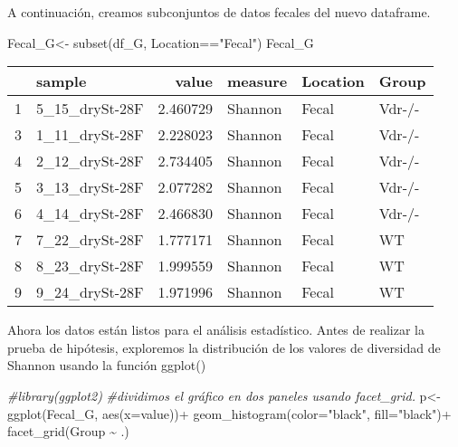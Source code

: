 \documentclass[
]{article}
\newenvironment{Shaded}{\begin{snugshade}}{\end{snugshade}}
\newcommand{\AttributeTok}[1]{\textcolor[rgb]{0.77,0.63,0.00}{#1}}
\newcommand{\CommentTok}[1]{\textcolor[rgb]{0.56,0.35,0.01}{\textit{#1}}}
\newcommand{\FunctionTok}[1]{\textcolor[rgb]{0.00,0.00,0.00}{#1}}
\newcommand{\NormalTok}[1]{#1}
\newcommand{\OtherTok}[1]{\textcolor[rgb]{0.56,0.35,0.01}{#1}}
\newcommand{\SpecialCharTok}[1]{\textcolor[rgb]{0.00,0.00,0.00}{#1}}
\newcommand{\StringTok}[1]{\textcolor[rgb]{0.31,0.60,0.02}{#1}}
\begin{document}
A continuación, creamos subconjuntos de datos fecales del nuevo
dataframe.

\begin{Shaded}
\begin{Highlighting}[]
\NormalTok{Fecal\_G}\OtherTok{\textless{}{-}} \FunctionTok{subset}\NormalTok{(df\_G, Location}\SpecialCharTok{==}\StringTok{"Fecal"}\NormalTok{)}
\NormalTok{Fecal\_G}
\end{Highlighting}
\end{Shaded}

\begin{longtable}[]{@{}llrlll@{}}
\toprule()
& sample & value & measure & Location & Group \\
\midrule()
\endhead
1 & 5\_15\_drySt-28F & 2.460729 & Shannon & Fecal & Vdr-/- \\
3 & 1\_11\_drySt-28F & 2.228023 & Shannon & Fecal & Vdr-/- \\
4 & 2\_12\_drySt-28F & 2.734405 & Shannon & Fecal & Vdr-/- \\
5 & 3\_13\_drySt-28F & 2.077282 & Shannon & Fecal & Vdr-/- \\
6 & 4\_14\_drySt-28F & 2.466830 & Shannon & Fecal & Vdr-/- \\
7 & 7\_22\_drySt-28F & 1.777171 & Shannon & Fecal & WT \\
8 & 8\_23\_drySt-28F & 1.999559 & Shannon & Fecal & WT \\
9 & 9\_24\_drySt-28F & 1.971996 & Shannon & Fecal & WT \\
\bottomrule()
\end{longtable}

Ahora los datos están listos para el análisis estadístico. Antes de
realizar la prueba de hipótesis, exploremos la distribución de los
valores de diversidad de Shannon usando la función ggplot()

\begin{Shaded}
\begin{Highlighting}[]
\CommentTok{\#library(ggplot2)}
\CommentTok{\#dividimos el gráfico en dos paneles usando facet\_grid.}
\NormalTok{p}\OtherTok{\textless{}{-}}\FunctionTok{ggplot}\NormalTok{(Fecal\_G, }\FunctionTok{aes}\NormalTok{(}\AttributeTok{x=}\NormalTok{value))}\SpecialCharTok{+}
  \FunctionTok{geom\_histogram}\NormalTok{(}\AttributeTok{color=}\StringTok{"black"}\NormalTok{, }\AttributeTok{fill=}\StringTok{"black"}\NormalTok{)}\SpecialCharTok{+}
  \FunctionTok{facet\_grid}\NormalTok{(Group }\SpecialCharTok{\textasciitilde{}}\NormalTok{ .)}
\end{Highlighting}
\end{Shaded}
\end{document}
